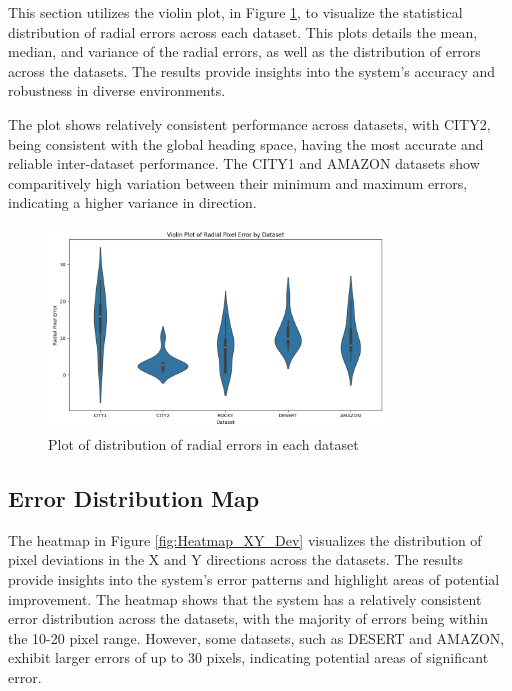 This section utilizes the violin plot, in Figure \ref{fig:Violin Dataset Plot}, to visualize the statistical distribution of radial errors across each dataset. This plots details the mean, median, and variance of the radial errors, as well as the distribution of errors across the datasets. The results provide insights into the system's accuracy and robustness in diverse environments. 

The plot shows relatively consistent performance across datasets, with CITY2, being consistent with the global heading space, having the most accurate and reliable inter-dataset performance. The CITY1 and AMAZON datasets show comparitively high variation between their minimum and maximum errors, indicating a higher variance in direction.

\begin{figure}[H]
    \centering
    \includegraphics[width=0.8\textwidth]{Chapter 5/RESULTPLOTS/violindatasets.png}
    \caption{Plot of distribution of radial errors in each dataset}
    \label{fig:Violin Dataset Plot}
\end{figure}



\subsection{Error Distribution Map}

The heatmap in Figure \ref{fig:Heatmap_XY_Dev} visualizes the distribution of pixel deviations in the X and Y directions across the datasets. The results provide insights into the system's error patterns and highlight areas of potential improvement. The heatmap shows that the system has a relatively consistent error distribution across the datasets, with the majority of errors being within the 10-20 pixel range. However, some datasets, such as DESERT and AMAZON, exhibit larger errors of up to 30 pixels, indicating potential areas of significant error. 

